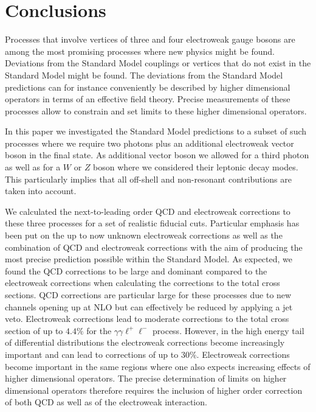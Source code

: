 \section{Conclusions}
\label{sec:conclusions}
Processes that involve vertices of three and four electroweak gauge bosons are among the most promising processes
where new physics might be found. Deviations from the Standard Model couplings or vertices that do not exist in the 
Standard Model might be found. The deviations from the Standard Model predictions can for instance conveniently be 
described by higher dimensional operators in terms of an effective field theory. Precise measurements of these  
processes allow to constrain and set limits to these higher dimensional operators.

In this paper we investigated the Standard Model predictions to a subset of such processes where we require
two photons plus an additional electroweak vector boson in the final state.  As additional vector boson we allowed
for a third photon as well as for a $W$ or $Z$ boson where we considered their leptonic decay modes.
This particularly implies that all off-shell and non-resonant contributions are taken into account.

We calculated the next-to-leading order QCD and electroweak corrections to these three processes for a set
of realistic fiducial cuts. Particular
emphasis has been put on the up to now unknown electroweak corrections as well as the combination of QCD and
electroweak corrections with the aim of producing the most precise prediction possible within the Standard Model.
As expected, we found the QCD corrections to be large and dominant compared to the electroweak corrections when 
calculating the corrections to the total cross sections. QCD corrections are particular large for these processes due to new
channels opening up at NLO but can effectively be reduced by applying a jet veto. Electroweak corrections
lead to moderate corrections to the total cross section of up to $4.4\%$ for the $\gamma\gamma \ell^{+}\ell^{-}$ 
process. However, in the high energy tail of differential distributions the electroweak corrections become increasingly important
and can lead to corrections of up to $30 \%$. Electroweak corrections become important in the same regions where one
also expects increasing effects of higher dimensional operators. The precise determination of limits on higher dimensional 
operators therefore requires the inclusion of higher order correction of both QCD as well as of the electroweak interaction.

